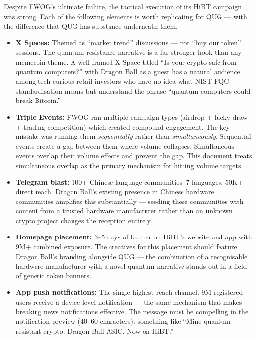 \documentclass[11pt,a4paper]{article}
\begin{document}
Despite FWOG's ultimate failure, the tactical execution of its HiBT campaign was strong. Each of the following elements is worth replicating for QUG — with the difference that QUG has substance underneath them.

\begin{itemize}[leftmargin=1.5em]
  \item \textbf{X Spaces:} Themed as ``market trend'' discussions — not ``buy our token'' sessions. The quantum-resistance narrative is a far stronger hook than any memecoin theme. A well-framed X Space titled ``Is your crypto safe from quantum computers?'' with Dragon Ball as a guest has a natural audience among tech-curious retail investors who have no idea what NIST PQC standardisation means but understand the phrase ``quantum computers could break Bitcoin.''

  \item \textbf{Triple Events:} FWOG ran multiple campaign types (airdrop + lucky draw + trading competition) which created compound engagement. The key mistake was running them \emph{sequentially} rather than \emph{simultaneously}. Sequential events create a gap between them where volume collapses. Simultaneous events overlap their volume effects and prevent the gap. This document treats simultaneous overlap as the primary mechanism for hitting volume targets.

  \item \textbf{Telegram blast:} 100+ Chinese-language communities, 7 languages, 50K+ direct reach. Dragon Ball's existing presence in Chinese hardware communities amplifies this substantially — seeding these communities with content from a trusted hardware manufacturer rather than an unknown crypto project changes the reception entirely.

  \item \textbf{Homepage placement:} 3--5 days of banner on HiBT's website and app with 9M+ combined exposure. The creatives for this placement should feature Dragon Ball's branding alongside QUG — the combination of a recognisable hardware manufacturer with a novel quantum narrative stands out in a field of generic token banners.

  \item \textbf{App push notifications:} The single highest-reach channel. 9M registered users receive a device-level notification — the same mechanism that makes breaking news notifications effective. The message must be compelling in the notification preview (40--60 characters): something like ``Mine quantum-resistant crypto. Dragon Ball ASIC. Now on HiBT.''
\end{itemize}
\end{document}
